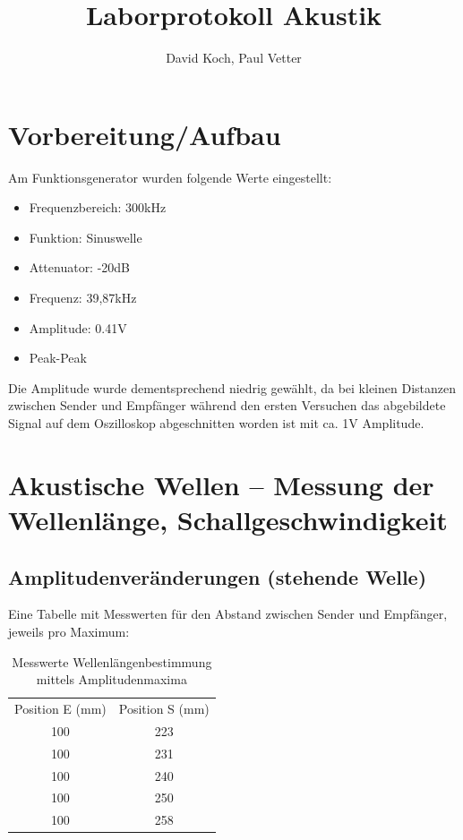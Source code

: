 \documentclass[
  headings=optiontotocandhead,
  twoside,
  openright,
  numbers=noenddot,
  toc=flat,
  11pt,
  parskip=full,
  listof=flat,
  bibliography=totoc,
  a4paper,
  DIV=14,
  BCOR=22mm,
  headheight=5mm,
  headinclude=true,
]{scrartcl}
\title{Laborprotokoll Akustik}
\author{David Koch, Paul Vetter}
\date{}
\begin{document}
\begin{titlepage}
\maketitle
\tableofcontents
\end{titlepage}

\setcounter{page}{2}
\renewcommand{\thepage}{\the\numexpr\value{page}-1\relax}

\section{Vorbereitung/Aufbau}

Am Funktionsgenerator wurden folgende Werte eingestellt:

\begin{itemize}
  \item Frequenzbereich: 300kHz
  \item Funktion: Sinuswelle
  \item Attenuator: -20dB
  \item Frequenz: 39,87kHz
  \item Amplitude: 0.41V
  \item Peak-Peak
\end{itemize}

Die Amplitude wurde dementsprechend niedrig gewählt, da bei kleinen Distanzen zwischen Sender und Empfänger während den ersten Versuchen das abgebildete Signal auf dem Oszilloskop abgeschnitten worden ist mit ca. 1V Amplitude.

\section{Akustische Wellen – Messung der Wellenlänge, Schallgeschwindigkeit}

\subsection{Amplitudenveränderungen (stehende Welle)}

Eine Tabelle mit Messwerten für den Abstand zwischen Sender und Empfänger, jeweils pro Maximum:

\begin{table}[H]
  \centering
  \setlength{\tabcolsep}{10pt}
  \begin{tabular}{ |c|c| }
    \multicolumn{1}{c}{Position E (mm)} & \multicolumn{1}{c}{Position S (mm)} \\
    100 & 223 \\
    100 & 231 \\
    100 & 240 \\
    100 & 250 \\
    100 & 258 \\
  \end{tabular}
  \caption{Messwerte Wellenlängenbestimmung mittels Amplitudenmaxima}
  \label{tab:wellenlaenge1}
\end{table}
\end{document}
